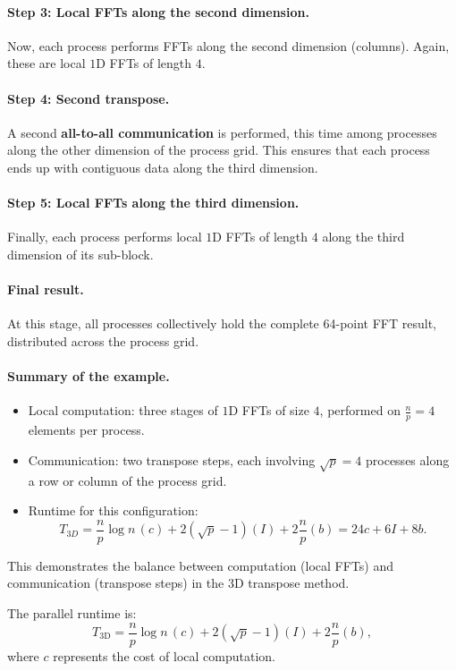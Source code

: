 \documentclass[12pt]{book}
\begin{document}
\paragraph{Step 3: Local FFTs along the second dimension.}  
Now, each process performs FFTs along the second dimension (columns). Again, these are local $1$D FFTs of length $4$.  

\paragraph{Step 4: Second transpose.}  
A second \textbf{all-to-all communication} is performed, this time among processes along the other dimension of the process grid.  
This ensures that each process ends up with contiguous data along the third dimension.

\paragraph{Step 5: Local FFTs along the third dimension.}  
Finally, each process performs local $1$D FFTs of length $4$ along the third dimension of its sub-block.  

\paragraph{Final result.}  
At this stage, all processes collectively hold the complete 64-point FFT result, distributed across the process grid.

\paragraph{Summary of the example.}  
\begin{itemize}
    \item Local computation: three stages of $1$D FFTs of size $4$, performed on $\frac{n}{p}=4$ elements per process.
    \item Communication: two transpose steps, each involving $\sqrt{p}=4$ processes along a row or column of the process grid.
    \item Runtime for this configuration:
    \[
    T_{3D} = \frac{n}{p}\log n \,(c) + 2(\sqrt{p}-1)(I) + 2\frac{n}{p}(b) 
           = 24c + 6I + 8b.
    \]
\end{itemize}
This demonstrates the balance between computation (local FFTs) and communication (transpose steps) in the 3D transpose method.

The parallel runtime is:
\[
T_{\text{3D}} = \frac{n}{p}\log n \,(c) + 2(\sqrt{p}-1)(I) + 2\frac{n}{p}(b),
\]
where $c$ represents the cost of local computation.
\end{document}
